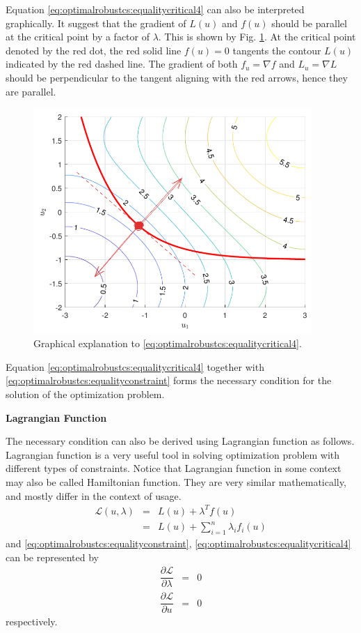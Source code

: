 Equation \eqref{eq:optimalrobustcs:equalitycritical4} can also be interpreted graphically. It suggest that the gradient of $L(u)$ and $f(u)$ should be parallel at the critical point by a factor of $\lambda$. This is shown by Fig. \ref{fig:optimalrobustcs:opt_equalityconstraint_graphical}. At the critical point denoted by the red dot, the red solid line $f(u)=0$ tangents the contour $L(u)$ indicated by the red dashed line. The gradient of both $f_u=\nabla f$ and $L_u=\nabla L$ should be perpendicular to the tangent aligning with the red arrows, hence they are parallel.
\begin{figure}
	\centering
	\includegraphics[width=300pt]{chapters/ch-optimal-robust-control-system/figures/opt_equalityconstraint_graphical.png}
	\caption{Graphical explanation to \eqref{eq:optimalrobustcs:equalitycritical4}.} \label{fig:optimalrobustcs:opt_equalityconstraint_graphical}
\end{figure}

Equation \eqref{eq:optimalrobustcs:equalitycritical4} together with \eqref{eq:optimalrobustcs:equalityconstraint} forms the necessary condition for the solution of the optimization problem.

\vspace{0.1in}
\noindent \textbf{Lagrangian Function}
\vspace{0.1in}

The necessary condition can also be derived using Lagrangian function as follows. Lagrangian function is a very useful tool in solving optimization problem with different types of constraints. Notice that Lagrangian function in some context may also be called Hamiltonian function. They are very similar mathematically, and mostly differ in the context of usage.
\begin{eqnarray}
	\mathcal{L}(u, \lambda) &=& L(u) + \lambda^Tf(u) \label{eq:optimalrobustcs:lagarangianequality} \\
	&=& L(u) + \sum_{i=1}^{n}\lambda_if_i(u) \nonumber
\end{eqnarray}
and \eqref{eq:optimalrobustcs:equalityconstraint}, \eqref{eq:optimalrobustcs:equalitycritical4} can be represented by
\begin{eqnarray}
	\dfrac{\partial \mathcal{L}}{\partial \lambda} &=& 0 \nonumber \\
	\dfrac{\partial \mathcal{L}}{\partial u} &=& 0 \nonumber
\end{eqnarray}
respectively.

